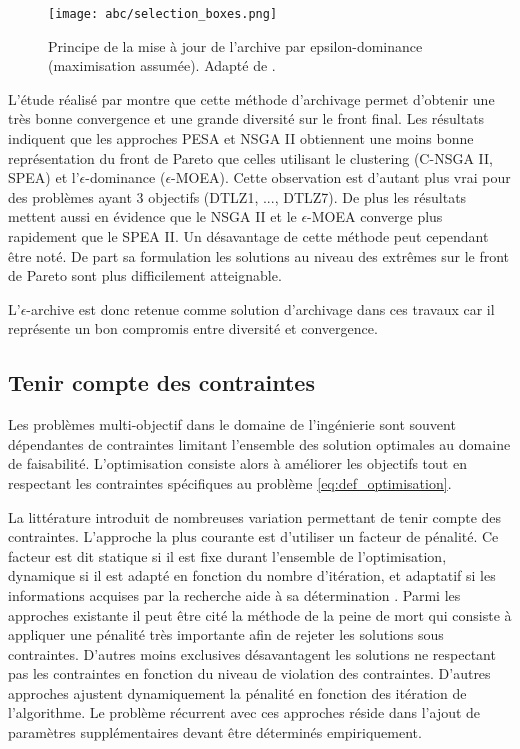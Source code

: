 \begin{figure}
    \begin{center}
        \texttt{[image: abc/selection\_boxes.png]}
    \end{center}
    \caption{Principe de la mise à jour de l’archive par epsilon-dominance (maximisation assumée).
             Adapté de \cite{Deb2005501}.
             \label{fig:epsilon_dominance}}
\end{figure}

L’étude réalisé par \cite{Deb2005501} montre que cette méthode d’archivage permet
d’obtenir une très bonne convergence et une grande diversité sur le front final. Les résultats
indiquent que les approches PESA et NSGA II obtiennent une moins bonne représentation
du front de Pareto que celles utilisant le clustering (C-NSGA II, SPEA) et l’$\epsilon$-dominance ($\epsilon$-MOEA).
Cette observation est d’autant plus vrai pour des problèmes ayant 3 objectifs (DTLZ1, ..., DTLZ7).
De plus les résultats mettent aussi en évidence que le NSGA II et le $\epsilon$-MOEA
converge plus rapidement que le SPEA II.
Un désavantage de cette méthode peut cependant être noté. De part sa formulation
les solutions au niveau des extrêmes sur le front de Pareto sont plus difficilement
atteignable.

L’$\epsilon$-archive est donc retenue comme solution d’archivage dans ces travaux
car il représente un bon compromis entre diversité et convergence.


\subsection{Tenir compte des contraintes} %
\label{sub:tenir_compte_des_contraintes}
Les problèmes multi-objectif dans le domaine de l’ingénierie sont souvent
dépendantes de contraintes limitant l’ensemble des solution optimales au domaine
de faisabilité. L’optimisation consiste alors à améliorer les objectifs tout en
respectant les contraintes spécifiques au problème \eqref{eq:def_optimisation}.

La littérature introduit de nombreuses variation permettant de tenir compte des
contraintes. L’approche la plus courante est d’utiliser un facteur de pénalité.
Ce facteur est dit statique si il est fixe durant l’ensemble de l’optimisation, dynamique
si il est adapté en fonction du nombre d’itération, et adaptatif si les informations
acquises par la recherche aide à sa détermination \parencite{Coello2002}.
Parmi les approches existante il peut être cité la méthode de la peine de mort
qui consiste à appliquer une pénalité très importante afin de rejeter les solutions
sous contraintes. D’autres moins exclusives désavantagent les solutions ne respectant
pas les contraintes en fonction du niveau de violation des contraintes. D’autres approches
ajustent dynamiquement la pénalité en fonction des itération de l’algorithme. Le
problème récurrent avec ces approches réside dans l’ajout de paramètres supplémentaires
devant être déterminés empiriquement.

